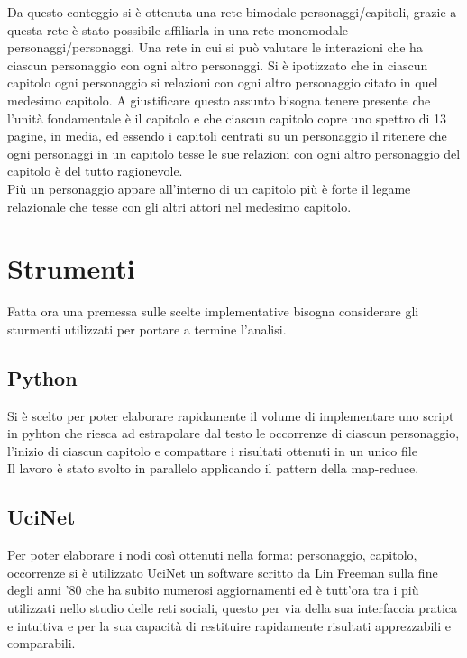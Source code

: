 \documentclass[a4paper]{article}
\begin{document}
Da questo conteggio si è ottenuta una rete bimodale personaggi/capitoli, grazie a questa rete è stato possibile affiliarla in una rete monomodale personaggi/personaggi. Una rete in cui si può valutare le interazioni che ha ciascun personaggio con ogni altro personaggi. Si è ipotizzato che in ciascun capitolo ogni personaggio si relazioni con ogni altro personaggio citato in quel medesimo capitolo. A giustificare questo assunto bisogna tenere presente che l'unità fondamentale è il capitolo e che ciascun capitolo copre uno spettro di 13 pagine, in media, ed essendo i capitoli centrati su un personaggio il ritenere che ogni personaggi in un capitolo tesse le sue relazioni con ogni altro personaggio del capitolo è del tutto ragionevole.\\ 
Più un personaggio appare all'interno di un capitolo più è forte il legame relazionale che tesse con gli altri attori nel medesimo capitolo.



\section{Strumenti}
Fatta ora una premessa sulle scelte implementative bisogna considerare gli sturmenti utilizzati per portare a termine l'analisi.\\

\subsection{Python}
Si è scelto per poter elaborare rapidamente il volume di implementare uno script in pyhton che riesca ad estrapolare dal testo le occorrenze di ciascun personaggio, l'inizio di ciascun capitolo e compattare i risultati ottenuti in un unico file\\
Il lavoro è stato svolto in parallelo applicando il pattern della map-reduce.


\subsection{UciNet}
Per poter elaborare i nodi così ottenuti nella forma: personaggio, capitolo, occorrenze si è utilizzato UciNet\cite{UciNet} un software scritto da Lin Freeman sulla fine degli anni '80 che ha subito numerosi aggiornamenti ed è tutt'ora tra i più utilizzati nello studio delle reti sociali, questo per via della sua interfaccia pratica e intuitiva e per la sua capacità di restituire rapidamente risultati apprezzabili e comparabili.
\end{document}
